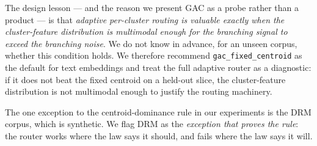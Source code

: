 The design lesson --- and the reason we present GAC as a probe rather
than a product --- is that \emph{adaptive per-cluster routing is
valuable exactly when the cluster-feature distribution is multimodal
enough for the branching signal to exceed the branching noise}. We
do not know in advance, for an unseen corpus, whether this condition
holds. We therefore recommend \texttt{gac\_fixed\_centroid} as the
default for text embeddings and treat the full adaptive router as a
diagnostic: if it does not beat the fixed centroid on a held-out
slice, the cluster-feature distribution is not multimodal enough to
justify the routing machinery.

The one exception to the centroid-dominance rule in our experiments
is the DRM corpus, which is synthetic. We flag DRM as the
\emph{exception that proves the rule}: the router works where the law
says it should, and fails where the law says it will.
